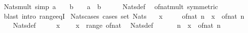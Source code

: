\begin{isabellebody}
\endisatagproof
{\isafoldproof}%
%
\isadelimproof
\isanewline
%
\endisadelimproof
\isanewline
{}\isamarkupfalse%
\ Nats{\isacharunderscore}{\kern0pt}mult\ {\isacharbrackleft}{\kern0pt}simp{\isacharbrackright}{\kern0pt}{\isacharcolon}{\kern0pt}\ {\isachardoublequoteopen}a\ {\isasymin}\ {\isasymnat}\ {\isasymLongrightarrow}\ b\ {\isasymin}\ {\isasymnat}\ {\isasymLongrightarrow}\ a\ {\isacharasterisk}{\kern0pt}\ b\ {\isasymin}\ {\isasymnat}{\isachardoublequoteclose}\isanewline
%
\isadelimproof
\ \ %
\endisadelimproof
%
\isatagproof
{}\isamarkupfalse%
\ Nats{\isacharunderscore}{\kern0pt}def\ \isamarkupfalse%
\ of{\isacharunderscore}{\kern0pt}nat{\isacharunderscore}{\kern0pt}mult\ {\isacharbrackleft}{\kern0pt}symmetric{\isacharbrackright}{\kern0pt}\isanewline
\ \ \isamarkupfalse%
\ {\isacharparenleft}{\kern0pt}blast\ intro{\isacharcolon}{\kern0pt}\ range{\isacharunderscore}{\kern0pt}eqI{\isacharparenright}{\kern0pt}%
\endisatagproof
{\isafoldproof}%
%
\isadelimproof
\isanewline
%
\endisadelimproof
\isanewline
{}\isamarkupfalse%
\ Nats{\isacharunderscore}{\kern0pt}cases\ {\isacharbrackleft}{\kern0pt}cases\ set{\isacharcolon}{\kern0pt}\ Nats{\isacharbrackright}{\kern0pt}{\isacharcolon}{\kern0pt}\isanewline
\ \ \ {\isachardoublequoteopen}x\ {\isasymin}\ {\isasymnat}{\isachardoublequoteclose}\isanewline
\ \ \ {\isacharparenleft}{\kern0pt}of{\isacharunderscore}{\kern0pt}nat{\isacharparenright}{\kern0pt}\ n\ \ {\isachardoublequoteopen}x\ {\isacharequal}{\kern0pt}\ of{\isacharunderscore}{\kern0pt}nat\ n{\isachardoublequoteclose}\isanewline
%
\isadelimproof
\ \ %
\endisadelimproof
%
\isatagproof
{}\isamarkupfalse%
\ Nats{\isacharunderscore}{\kern0pt}def\isanewline
{}\isamarkupfalse%
\ {\isacharminus}{\kern0pt}\isanewline
\ \ \isamarkupfalse%
\ {\isacartoucheopen}x\ {\isasymin}\ {\isasymnat}{\isacartoucheclose}\ \isamarkupfalse%
\ {\isachardoublequoteopen}x\ {\isasymin}\ range\ of{\isacharunderscore}{\kern0pt}nat{\isachardoublequoteclose}\ \isamarkupfalse%
\ Nats{\isacharunderscore}{\kern0pt}def\ \isacommand{{\isachardot}{\kern0pt}}\isamarkupfalse%
\isanewline
\ \ \isamarkupfalse%
\ \isamarkupfalse%
\ n\ \ {\isachardoublequoteopen}x\ {\isacharequal}{\kern0pt}\ of{\isacharunderscore}{\kern0pt}nat\ n{\isachardoublequoteclose}\ \isacommand{{\isachardot}{\kern0pt}{\isachardot}{\kern0pt}}\isamarkupfalse%

\end{isabellebody}
